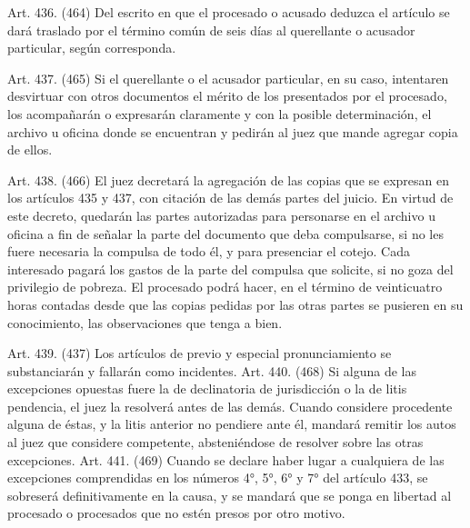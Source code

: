     Art. 436. (464) Del escrito en que el procesado o acusado deduzca el artículo se dará traslado por el término común de seis días al querellante o acusador particular, según corresponda.

    Art. 437. (465) Si el querellante o el acusador particular, en su caso, intentaren desvirtuar con otros documentos el mérito de los presentados por el procesado, los acompañarán o expresarán claramente y con la posible determinación, el archivo u oficina donde se encuentran y pedirán al juez que mande agregar copia de ellos.

    Art. 438. (466) El juez decretará la agregación de las copias que se expresan en los artículos 435 y 437, con citación de las demás partes del juicio. En virtud de este decreto, quedarán las partes autorizadas para personarse en el archivo u oficina a fin de señalar la parte del documento que deba compulsarse, si no les fuere necesaria la compulsa de todo él, y para presenciar el cotejo. Cada interesado pagará los gastos de la parte del compulsa que solicite, si no goza del privilegio de pobreza.
    El procesado podrá hacer, en el término de veinticuatro horas contadas desde que las copias pedidas por las otras partes se pusieren en su conocimiento, las observaciones que tenga a bien.


    Art. 439. (437) Los artículos de previo y especial pronunciamiento se substanciarán y fallarán como incidentes.
    Art. 440. (468) Si alguna de las excepciones opuestas fuere la de declinatoria de jurisdicción o la de litis pendencia, el juez la resolverá antes de las demás. Cuando considere procedente alguna de éstas, y la litis anterior no pendiere ante él, mandará remitir los autos al juez que considere competente, absteniéndose de resolver sobre las otras excepciones.
    Art. 441. (469) Cuando se declare haber lugar a cualquiera de las excepciones comprendidas en los números 4°, 5°, 6° y 7° del artículo 433, se sobreserá definitivamente en la causa, y se mandará que se ponga en libertad al procesado o procesados que no estén presos por otro motivo.




